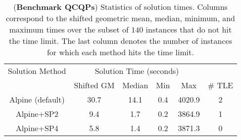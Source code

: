 \documentclass{article}
\begin{document}
\begin{table}
\centering
\begin{tabular}{ c | c c c c | c }
\hline
Solution Method & \multicolumn{4}{c|}{Solution Time (seconds)} \\
& Shifted GM & Median & Min & Max & \# TLE \\ \hline
Alpine (default)  &  30.7  &  14.1  &  0.4  &  4020.9  &  2  \\
Alpine+SP2  &  9.4  &  1.7  &  0.2  &  3864.9  &  1  \\
Alpine+SP4  &  5.8  &  1.4  &  0.2  &  3871.3  &  0  \\ \hline
\end{tabular}
\caption{
(\textbf{Benchmark QCQPs}) Statistics of solution times. 
Columns correspond to the shifted geometric mean, median, minimum, and maximum times over the subset of $140$ instances that do not hit the time limit. 
The last column denotes the number of instances for which each method hits the time limit.
}
\label{tab:baron_library}
\end{table}
\end{document}
